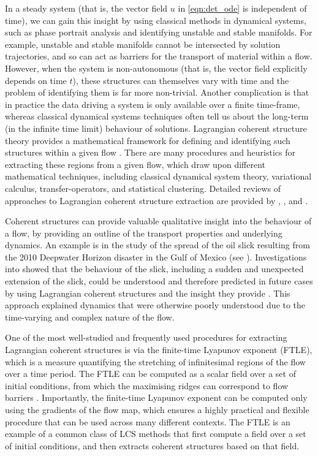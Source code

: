 In a steady system (that is, the vector field \(u\) in \cref{eqn:det_ode} is independent of time), we can gain this insight by using classical methods in dynamical systems, such as phase portrait analysis and identifying unstable and stable manifolds.
For example, unstable and stable manifolds cannot be intersected by solution trajectories, and so can act as barriers for the transport of material within a flow.
However, when the system is non-autonomous (that is, the vector field explicitly depends on time \(t\)), these structures can themselves vary with time and the problem of identifying them is far more non-trivial.
Another complication is that in practice the data driving a system is only available over a finite time-frame, whereas classical dynamical systems techniques often tell us about the long-term (in the infinite time limit) behaviour of solutions.
Lagrangian coherent structure theory provides a mathematical framework for defining and identifying such structures within a given flow \citep{BalasuriyaEtAl_2018_GeneralizedLagrangianCoherent}.
There are many procedures and heuristics for extracting these regions from a given flow, which draw upon different mathematical techniques, including classical dynamical system theory, variational calculus, transfer-operators, and statistical clustering.
Detailed reviews of approaches to Lagrangian coherent structure extraction are provided by \citet{PeacockDabiri_2010_IntroductionFocusIssue}, \citet{HadjighasemEtAl_2017_CriticalComparisonLagrangian}, and \citet{BalasuriyaEtAl_2018_GeneralizedLagrangianCoherent}.

Coherent structures can provide valuable qualitative insight into the behaviour of a flow, by providing an outline of the transport properties and underlying dynamics.
An example is in the study of the spread of the oil slick resulting from the 2010 Deepwater Horizon disaster in the Gulf of Mexico (see ).
Investigations into showed that the behaviour of the slick, including a sudden and unexpected extension of the slick, could be understood and therefore predicted in future cases by using Lagrangian coherent structures and the insight they provide \citep{OlascoagaEtAl_2013_DrifterMotionGulf,OlascoagaHaller_2012_ForecastingSuddenChanges,MezicEtAl_2010_NewMixingDiagnostic}.
This approach explained dynamics that were otherwise poorly understood due to the time-varying and complex nature of the flow.

One of the most well-studied and frequently used procedures for extracting Lagrangian coherent structures is via the finite-time Lyapunov exponent (FTLE), which is a measure quantifying the stretching of infinitesimal regions of the flow over a time period.
The FTLE can be computed as a scalar field over a set of initial conditions, from which the maximising ridges can correspond to flow barriers \citep{ShaddenEtAl_2005_DefinitionPropertiesLagrangian}.
Importantly, the finite-time Lyapunov exponent can be computed only using the gradients of the flow map, which ensures a highly practical and flexible procedure that can be used across many different contexts.
The FTLE is an example of a common class of LCS methods that first compute a field over a set of initial conditions, and then extracts coherent structures based on that field.

